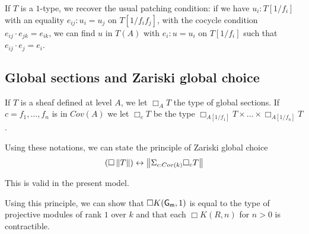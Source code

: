 If $T$ is a $1$-type, we recover the usual patching condition: if we have $u_i:T[1/f_i]$ with an equality $e_{ij}:u_i = u_j$ on
$T[1/f_if_j]$, with the cocycle condition $e_{ij}\cdot e_{jk} = e_{ik}$,
we can find $u$ in $T(A)$ with $e_i:u = u_i$ on $T[1/f_i]$ such that $e_{ij}\cdot e_j = e_i$.



 








\subsection{Global sections and Zariski global choice}

If $T$ is a sheaf defined at level $A$, we let $\Box_A T$ the type of global sections.
If $c = f_1,\dots,f_n$ is in $Cov(A)$ we let $\Box_c T$ be the type $\Box_{A[1/f_1]}T\times\dots\times\Box_{A[1/f_n]}T$.

Using these notations, we can state the principle of Zariski global choice
$$
(\Box \left\lVert T \right\rVert)\leftrightarrow \left\lVert \Sigma_{c:Cov(k)}\Box_c T \right\rVert
$$

This is valid in the present model.

Using this principle, we can show that $\Box K(\mathsf{G_m},1)$ is equal to the type of projective modules of rank $1$ over $k$
and that each $\Box K(R,n)$ for $n>0$ is contractible.
                                                                                  




 

